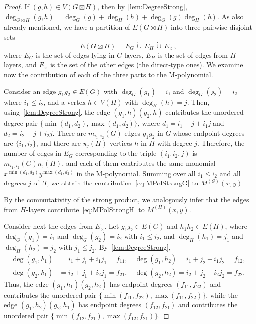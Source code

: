 \documentclass[letterpaper,12pt]{article}
\begin{document}
\begin{proof}
If $(g,h)\in V(G\boxtimes H)$, then by~\eqref{lem:DegreeStrong}, $\deg_{G\boxtimes H}(g,h) = \deg_G(g) + \deg_H(h) + \deg_G(g)\deg_H(h)$. As also already mentioned, we have a partition of $E(G\boxtimes H)$ into three pairwise disjoint sets
\begin{equation}\label{eq:StrongStructure}
    E(G\boxtimes H)
=
E_G \, \dot\cup \, E_H  \, \dot\cup \, E_\times\,,
\end{equation}
where $E_G$ is the set of edges lying in $G$-layers, $E_H$ is the set of edges from $H$-layers, and $E_\times$ is the set of the other edges (the direct-type ones). We examine now the contribution of each of the three parts to the M-polynomial. 

Consider an edge $g_1g_2\in E(G)$ with $\deg_G(g_1)=i_1$ and  $ \deg_G(g_2)=i_2$ where $i_1\le i_2$,   and a vertex $h\in V(H)$ with $\deg_H(h)=j$. Then, using~\eqref{lem:DegreeStrong}, the edge $(g_1,h)(g_2,h)$ contributes the unordered degree-pair $\{\min(d_1,d_2),\max(d_1,d_2)\}$, where $d_1 = i_1 + j + i_1j$ and $d_2 = i_2 + j + i_2j$. There are $m_{i_1,i_2}(G)$ edges $g_1g_2$ in $G$ whose endpoint degrees are $\{i_1,i_2\}$, and there are $n_j(H)$ vertices $h$ in $H$ with degree $j$. Therefore, the number of edges in $E_G$ corresponding to the triple $(i_1,i_2,j)$ is $m_{i_1,i_2}(G) n_j(H)$, and each of them contributes the same monomial $x^{\min(d_1,d_2)}y^{\max(d_1,d_2)}$ in the M-polynomial. Summing over all $i_1\le i_2$ and all degrees $j$ of $H$, we obtain the contribution~\eqref{eq:MPolStrongG} to $M^{(G)}(x,y)$.

By the commutativity of the strong product, we analogously infer that the edges from $H$-layers contribute~\eqref{eq:MPolStrongH} to $M^{(H)}(x,y)$.
 
Consider next the edges from $E_\times$. Let $g_1g_2\in E(G)$ and $h_1h_2\in E(H)$, where $\deg_G(g_1)=i_1$ and $\deg_G(g_2)=i_2$ with $i_1\le i_2$, and $\deg_H(h_1)=j_1$ and $\deg_H(h_2)=j_2$ with $j_1\le j_2$. By~\eqref{lem:DegreeStrong}, 
\[
\begin{aligned}
\deg(g_1,h_1) &= i_1 + j_1 + i_1j_1 = f_{11},\quad \deg(g_1,h_2) = i_1 + j_2 + i_1j_2 = f_{12},\\
\deg(g_2,h_1) &= i_2 + j_1 + i_2j_1 = f_{21}, \quad \deg(g_2,h_2) = i_2 + j_2 + i_2j_2 = f_{22}.
\end{aligned}
\]
Thus, the edge $(g_1,h_1)(g_2,h_2)$ has endpoint degrees          $(f_{11},f_{22})$ and contributes the unordered pair $\{\min(f_{11},f_{22}),\max(f_{11},f_{22})\}$, while the edge $(g_1,h_2)(g_2,h_1)$ has endpoint degrees $(f_{12},f_{21})$ and contributes the unordered pair $\{\min(f_{12},f_{21}),\max(f_{12},f_{21})\}$.


\end{proof}
\end{document}
